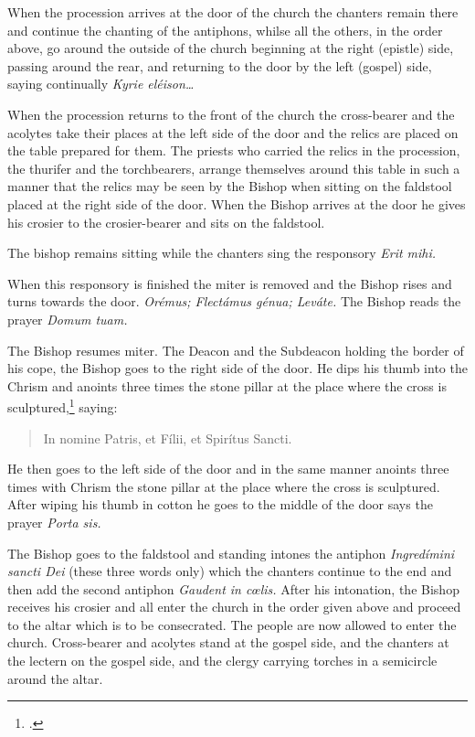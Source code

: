 \documentclass[letterpaper]{report}
\newcommand\src{\textsc{S.R.C.}}
\begin{document}
{    When the procession arrives at the door of the church the chanters remain
    there and continue the chanting of the antiphons, whilse all the others, in
    the order above, go around the outside of the church beginning at the right
    (epistle) side, passing around the rear, and returning to the door by the
    left (gospel) side, saying continually \textit{Kyrie eléison\dots}

    \rubric When the procession returns to the front of the church the
    cross-bearer and the acolytes take their places at the left side of the
    door and the relics are placed on the table prepared for them. The priests
    who carried the relics in the procession, the thurifer and the
    torchbearers, arrange themselves around this table in such a manner that
    the relics may be seen by the Bishop when sitting on the faldstool placed
    at the right side of the door. When the Bishop arrives at the door he gives
    his crosier to the crosier-bearer and sits on the faldstool.


    \rubric The bishop remains sitting while the chanters sing the responsory
    \textit{Erit mihi.}

    \rubric When this responsory is finished the miter is removed and the
    Bishop rises and turns towards the door. \textit{Orémus; Flectámus génua;
    Leváte.} The Bishop reads the prayer \textit{Domum tuam.}

    \rubric The Bishop resumes miter. The Deacon and the Subdeacon holding the
    border of his cope, the Bishop goes to the right side of the door. He dips
    his thumb into the Chrism and anoints three times the stone pillar at the
    place where the cross is sculptured,\footcite[The Pontifical says
    ''\textit{signat ostium,''} which the \src, Aug. 7, 1875, n. 3364 ad VI,
    interprets to mean the two stone or brick pillars at the sides of the
    door.][footnote 1, p. 83.]{consecranda} saying:

    \begin{quote}
       In nomine Pa\cross tris, et Fí\cross lii, et Spirítus \cross Sancti.
    \end{quote}

    He then goes to the left side of the door and in the same manner anoints three
    times with Chrism the stone pillar at the place where the cross is sculptured.
    After wiping his thumb in cotton he goes to the middle of the door says the
    prayer \textit{Porta sis.}

    \rubric The Bishop goes to the faldstool and standing intones the antiphon
    \textit{Ingred\'imini sancti Dei} (these three words only) which the
    chanters continue to the end and then add the second antiphon
    \textit{Gaudent in c\oe lis.} After his intonation, the Bishop receives his
    crosier and all enter the church in the order given above and proceed to
    the altar which is to be consecrated. The people are now allowed to enter
    the church. Cross-bearer and acolytes stand at the gospel side, and the
    chanters at the lectern on the gospel side, and the clergy carrying torches
    in a semicircle around the altar. 

}
\end{document}
